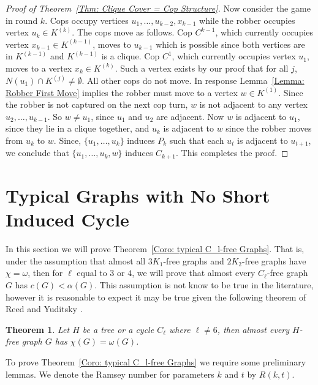 \documentclass[12pt]{amsart}
\newtheorem{theorem}{Theorem}[section]
\theoremstyle{definition}
\begin{document}
\begin{proof}[Proof of Theorem~\ref{Thm: Clique Cover = Cop Structure}]
    Now consider the game in round $k$.
    Cops occupy vertices $u_1,\dots, u_{k-2},x_{k-1}$ while the robber occupies vertex $u_k \in K^{(k)}$.
    The cops move as follows. 
    Cop $C^{k-1}$, which currently occupies vertex $x_{k-1} \in K^{(k-1)}$, moves to $u_{k-1}$
    which is possible since both vertices are in $K^{(k-1)}$ and $K^{(k-1)}$ is a clique.
    Cop $C^1$, which currently occupies vertex $u_1$, moves to a vertex $x_k \in K^{(k)}$.
    Such a vertex exists by our proof that for all $j$, $N(u_1)\cap K^{(j)} \neq \emptyset$.
    All other cops do not move.
    In response Lemma~\ref{Lemma: Robber First Move} implies the robber must move to a vertex $w \in K^{(1)}$.
    Since the robber is not captured on the next cop turn, $w$ is not adjacent to any vertex $u_2,\dots, u_{k-1}$.
    So $w\neq u_1$, since $u_1$ and $u_2$ are adjacent.
    Now $w$ is adjacent to $u_1$, since they lie in a clique together, and $u_k$ is adjacent to $w$ since the robber moves from $u_k$ to $w$.
    Since, $\{u_1,\dots, u_{k}\}$ induces $P_k$ such that each $u_t$ is adjacent to $u_{t+1}$,
    we conclude that $\{u_1,\dots, u_{k},w\}$ induces $C_{k+1}$.
    This completes the proof.
\end{proof}



\section{Typical Graphs with No Short Induced Cycle}

In this section we will prove Theorem~\ref{Coro: typical C_l-free Graphs}.
That is, under the assumption that almost all $3K_1$-free graphs and $2K_2$-free graphs have $\chi = \omega$,
then for $\ell$ equal to $3$ or $4$, we will prove that almost every $C_\ell$-free graph $G$ has $c(G) < \alpha(G)$.
This assumption is not know to be true in the literature, 
however it is reasonable to expect it may be true given  the following theorem of Reed and Yuditsky \cite{reed2025asymptotic}.

\begin{theorem}\label{Thm: R&Y}
    Let $H$ be a tree or a cycle $C_\ell$ where $\ell\neq 6$, then almost every $H$-free graph $G$ has $\chi(G) = \omega(G)$.
\end{theorem}

To prove Theorem~\ref{Coro: typical C_l-free Graphs} we require some preliminary lemmas.
We denote the Ramsey number for parameters $k$ and $t$ by $R(k,t)$.
\end{document}
